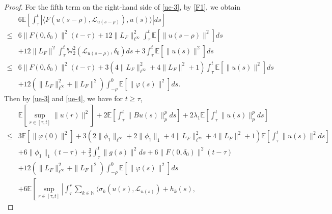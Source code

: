 \documentclass[11pt]{article}
\numberwithin{equation}{section}
\theoremstyle{plain}
\begin{document}
\begin{proof}
 For the fifth term on the right-hand side of \eqref{ue-3},
 by \eqref{F1}, we obtain
 \begin{align}\label{ue-4}
        & 6 \mathbb{E}
                \left[ \int_{\tau}^{t} \left| \langle F(u(s-\rho),\mathcal{L}_{u(s-\rho)}),  u(s) \rangle \right| ds
                \right]  \nonumber \\
   \le & 6 \|F(0,\delta_0)\|^2 (t-\tau)
          + 12 \|L_{F}\|_{\ell^\infty}^2 \int_{\tau}^{t} \mathbb{E} \left[ \|u(s-\rho)\|^2 \right] ds  \nonumber \\
        & + 12 \|L_{F}\|^2 \int_{\tau}^{t} \mathbb{W}_2^2(\mathcal{L}_{u(s-\rho)}, \delta_0) ds
          + 3 \int_{\tau}^{t} \mathbb{E} \left[ \|u(s)\|^2 \right] ds  \nonumber \\
   \le & 6 \|F(0,\delta_0)\|^2 (t-\tau)
          + 3 \left( 4 \|L_{F}\|_{\ell^\infty}^2 + 4 \|L_{F}\|^2 + 1 \right)
            \int_{\tau}^{t} \mathbb{E} \left[ \|u(s)\|^2 \right] ds  \nonumber \\
        & + 12 \left( \|L_{F}\|_{\ell^\infty}^2 + \|L_{F}\|^2 \right)
            \int_{-\rho}^{0} \mathbb{E} \left[ \|\varphi(s)\|^2 \right] ds.
\end{align}
  Then by \eqref{ue-3} and \eqref{ue-4}, we have
  for $t\ge \tau$,
 \begin{align} \label{ue-5}
       & \mathbb{E} \left[ \sup_{r \in [\tau, t]} \|u(r)\|^2 \right]
         + 2 \mathbb{E} \left[ \int_{\tau}^{t} \|B u(s)\|_p^p ds \right]
         + 2 \lambda_1 \mathbb{E} \left[ \int_{\tau}^{t} \|u(s)\|^p_p ds \right]  \nonumber \\
  \le & 3 \mathbb{E} \left[ \|\varphi(0)\|^2 \right]
         + 3 \left( 2 \|\phi_1\|_{\ell^\infty} + 2 \|\phi_1\|_1 + 4 \|L_{F}\|_{\ell^\infty}^2 + 4 \|L_{F}\|^2 + 1
             \right)
           \mathbb{E}
              \left[ \int_{\tau}^{t} \| u(s)\|^2 ds
              \right]  \nonumber \\
       & + 6 \|\phi_1\|_1 (t-\tau)
         + \frac{3}{\lambda} \int_{\tau}^{t}  \|g(s)\|^2 ds
         + 6 \|F(0,\delta_0)\|^2 (t-\tau)  \nonumber \\
       & + 12 \left( \|L_{F}\|_{\ell^\infty}^2 + \|L_{F}\|^2 \right)
              \int_{-\rho}^{0} \mathbb{E} \left[ \|\varphi(s)\|^2 \right] ds \nonumber \\
       & + 6 \mathbb{E}
                \left[ \sup_{r \in [\tau, t]}
                       \left| \int_{\tau}^{r} \sum_{k \in \mathbb{N} }
                                 \langle \sigma_k(u(s), \mathcal{L}_{u(s)}) + h_k(s),

\end{align}
\end{proof}
\end{document}
